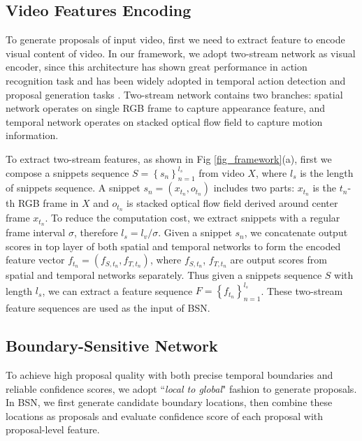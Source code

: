 \documentclass[runningheads]{llncs}
\begin{document}
\subsection{Video Features Encoding}

To generate proposals of input video, first we need to extract feature to encode visual content of video.
In our framework, we adopt two-stream network \cite{simonyan2014two} as visual encoder, since this architecture has shown great performance in action recognition task \cite{wang2016temporal} and has been widely adopted in temporal action detection and proposal generation tasks \cite{zhao2017temporal,ssad,gao2017cascaded}.
Two-stream network contains two branches: spatial network  operates on single RGB frame to capture appearance feature, and temporal network operates on stacked optical flow field to capture motion information.

To extract two-stream features, as shown in Fig \ref{fig_framework}(a), first we compose a snippets sequence $S=\left \{ s_n \right \}_{n=1}^{l_s}$ from video $X$, where $l_s$ is the length of snippets sequence.  A snippet $s_n=(x_{t_n}, o_{t_n})$ includes two parts: $x_{t_n}$ is the $t_n$-th RGB frame in $X$ and $o_{t_n}$ is stacked optical flow field derived around center frame $x_{t_n}$.
To reduce the computation cost, we extract snippets with a regular frame interval $\sigma $, therefore  $l_s=l_v/\sigma$.
Given a snippet $s_n$, we concatenate output scores in top layer of both spatial and temporal networks to form the encoded feature vector $f_{t_n}=(f_{S,t_n},f_{T,t_n})$, where $f_{S,t_n}$, $f_{T,t_n}$ are output scores from spatial and temporal networks separately.
Thus given a snippets sequence $S$ with length $l_s$, we can extract a feature sequence $F=\left \{ f_{t_n} \right \}_{n=1}^{l_s}$. These two-stream feature sequences are used as the input of BSN.



\subsection{Boundary-Sensitive Network}

To achieve high proposal quality with both precise temporal boundaries and reliable confidence scores, we adopt ``\emph{local to global}" fashion to generate proposals. In BSN, we first generate candidate boundary locations, then combine these locations as proposals and evaluate confidence score of each proposal with proposal-level feature.
\end{document}
